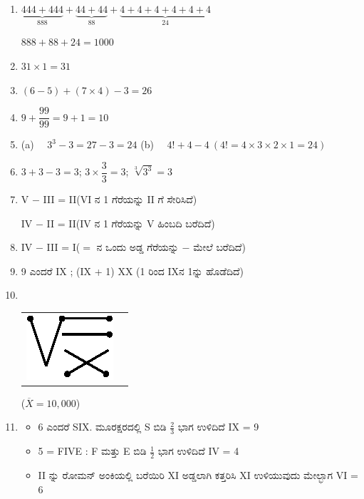 \begin{enumerate}
\itemsep=5pt

\item $\underbrace{444 + 444}_{888} + \underbrace{44 + 44}_{88} + \underbrace{4 + 4 + 4 + 4 + 4 + 4}_{24}$

$888 + 88 + 24 = 1000$

\item $31 \times 1 = 31$

\item $(6- 5) + (7 \times 4) - 3 = 26$

\item $9 + \dfrac{99}{99} = 9 + 1 = 10$

\item {\fontsize{11pt}{13pt}\selectfont(a)~~ $3^{3} - 3 = 27 - 3 = 24$ \quad (b)~~  $4! + 4 - 4 \ (4! = 4 \times 3 \times 2 \times 1 = 24)$}\relax


\item $3 + 3 - 3 = 3$; $3 \times \dfrac{3}{3} = 3$; $\sqrt[3]{3^{3}} = 3$

\item V $-$ III = II\quad (VI ನ 1 ಗೆರೆಯನ್ನು II ಗೆ ಸೇರಿಸಿದೆ)

IV $-$ II = II\quad (IV ನ 1 ಗೆರೆಯನ್ನು  V ಹಿಂಬದಿ ಬರೆದಿದೆ)

\item IV $-$ III = I\quad ($=$ ನ ಒಂದು ಅಡ್ಡ ಗೆರೆಯನ್ನು $-$ ಮೇಲೆ ಬರೆದಿದೆ)

\item 9 ಎಂದರೆ IX ; (IX + 1) XX (1 ರಿಂದ IXನ 1ನ್ನು ಹೊಡೆದಿದೆ)

\item 
~

\begin{tabular}[t]{cc}
\includegraphics[scale =0.7]{images/chap4/ans10.eps} & \raisebox{.5cm}{= $\sqrt{10,000} = 100$}
\end{tabular}

($\overline{X} = 10,000$)


\item 
\begin{itemize}
\item[(a)] 6 ಎಂದರೆ SIX. ಮೂರಕ್ಷರದಲ್ಲಿ S ಬಿಡಿ $\frac{2}{3}$ ಭಾಗ ಉಳಿದಿದೆ IX = 9
\item[(b)] 5 = FIVE : F ಮತ್ತು E ಬಿಡಿ $\frac{1}{2}$ ಭಾಗ ಉಳಿದಿದೆ  IV = 4
\item[(c)] II ನ್ನು ರೋಮನ್ ಅಂಕಿಯಲ್ಲಿ ಬರೆಯಿರಿ XI ಅಡ್ಡಲಾಗಿ ಕತ್ತರಿಸಿ XI ಉಳಿಯುವುದು ಮೇಲ್ಭಾಗ VI = 6
\end{itemize}



\end{enumerate}
